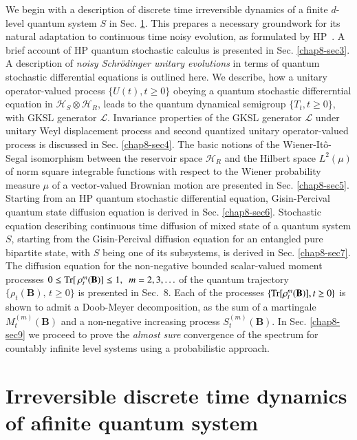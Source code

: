 We begin with a description of discrete time irreversible dynamics of a finite $d$-level quantum system $S$ in Sec. \ref{chap8-sec2}. This  prepares a necessary groundwork for its natural adaptation to  continuous time noisy evolution, as formulated by HP~\cite{chap8-key7,chap8-key8}. A brief account of HP quantum stochastic calculus is presented in Sec. \ref{chap8-sec3}. A description of  {\it noisy Schr{\"o}dinger unitary evolutions} in terms of quantum stochastic differential equations is outlined here. We describe,  how a   unitary operator-valued process $\{U(t), t\geq 0\}$ obeying a quantum stochastic differerntial equation  in $\mathcal{H}_S\otimes \mathcal{H}_R$, leads to  the quantum dynamical semigroup $\{T_t, t\geq 0\}$, with GKSL generator $\mathcal{L}$.  Invariance  properties of the GKSL generator $\mathcal{L}$ under  unitary Weyl displacement process and second quantized  unitary operator-valued process is discussed  in Sec. \ref{chap8-sec4}. The basic notions of the Wiener-It{\^o}-Segal isomorphism between the reservoir space $\mathcal{H}_R$ and the Hilbert space $L^2(\mu)$ of norm square integrable functions with respect to the Wiener probability measure $\mu$ of a vector-valued Brownian motion are presented in Sec. \ref{chap8-sec5}. Starting from an HP quantum stochastic differential equation,  Gisin-Percival~\cite{chap8-key9} quantum state diffusion equation is derived in Sec. \ref{chap8-sec6}.  Stochastic equation describing continuous time diffusion of mixed state of a quantum system $S$, starting from the Gisin-Percival diffusion equation for an entangled pure bipartite state, with $S$ being one of its subsystems, is derived in Sec. \ref{chap8-sec7}. The diffusion equation for  the non-negative bounded scalar-valued  moment processes  $0\leq {\rm Tr}[\, \rho_t^m(\mathbf{B})]\leq 1,\ \  m=2,3,\ldots$ of the quantum trajectory $\{\rho_t(\mathbf{B}),\, t\geq 0\}$ is presented in Sec.~8. Each of the processes $\{{\rm Tr}[\rho_t^m( \mathbf{B})], t\geq 0\}$ is shown to admit a Doob-Meyer decomposition,  as the sum of a martingale $M^{(m)}_t(\mathbf{B})$ and a non-negative increasing process $S^{(m)}_t(\mathbf{B})$. In Sec. \ref{chap8-sec9} we proceed to prove the {\em almost sure} convergence of the spectrum for countably infinite level systems using a probabilistic approach.   

\section[Irreversible discrete time dynamics of a finite quantum system]{Irreversible discrete time dynamics of a\break finite quantum system}\label{chap8-sec2}

